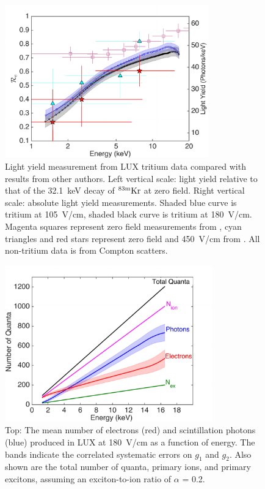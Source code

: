 \begin{figure}[h!]
\includegraphics[width=88mm]{fig/Re_LY_log.pdf}
\caption{Light yield measurement from LUX tritium data compared with results from other authors. Left vertical scale: light yield relative to that of the 32.1~keV decay of $\rm ^{83m}Kr $ at zero field. Right vertical scale: absolute light yield measurements. Shaded blue curve is tritium at 105~V/cm, shaded black curve is tritium at 180~V/cm. Magenta squares represent zero field measurements from \cite{Aprile_LY}, cyan triangles and red stars represent zero field and 450~V/cm from \cite{Baudis}. All non-tritium data is from Compton scatters. }
\label{fig:Re_LY}
\end{figure}

\begin{figure}[h!]
\includegraphics[width=90mm]{fig/quanta-vs-energy.pdf}
\caption{Top: The mean number of electrons (red) and scintillation photons (blue) produced in LUX at 180~V/cm as a function of energy. The bands indicate the correlated systematic errors on $g_1$ and $g_2$. Also shown are the total number of quanta, primary ions, and primary excitons, assuming an exciton-to-ion ratio of $\alpha$ = 0.2. }
\label{fig:quanta-vs-energy}
\end{figure}

